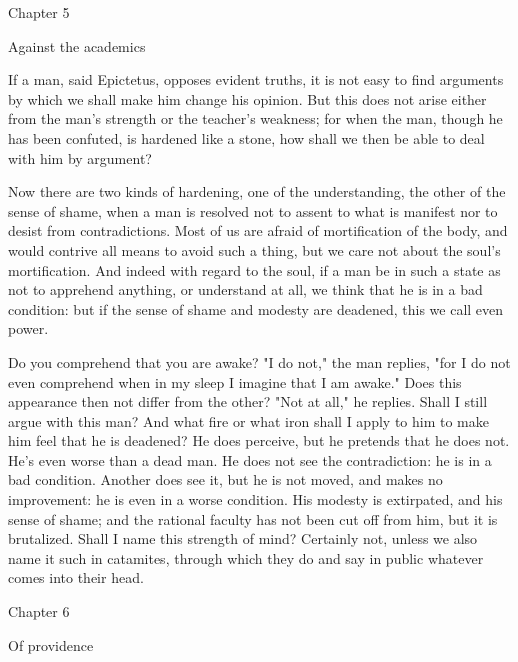 \documentclass[a4paper]{article}
\begin{document}
Chapter 5

Against the academics 

If a man, said Epictetus, opposes evident truths, it is not easy to
find arguments by which we shall make him change his opinion. But
this does not arise either from the man's strength or the teacher's
weakness; for when the man, though he has been confuted, is hardened
like a stone, how shall we then be able to deal with him by argument?

Now there are two kinds of hardening, one of the understanding, the
other of the sense of shame, when a man is resolved not to assent
to what is manifest nor to desist from contradictions. Most of us
are afraid of mortification of the body, and would contrive all means
to avoid such a thing, but we care not about the soul's mortification.
And indeed with regard to the soul, if a man be in such a state as
not to apprehend anything, or understand at all, we think that he
is in a bad condition: but if the sense of shame and modesty are deadened,
this we call even power. 

Do you comprehend that you are awake? "I do not," the man replies,
"for I do not even comprehend when in my sleep I imagine that I am
awake." Does this appearance then not differ from the other? "Not
at all," he replies. Shall I still argue with this man? And what fire
or what iron shall I apply to him to make him feel that he is deadened?
He does perceive, but he pretends that he does not. He's even worse
than a dead man. He does not see the contradiction: he is in a bad
condition. Another does see it, but he is not moved, and makes no
improvement: he is even in a worse condition. His modesty is extirpated,
and his sense of shame; and the rational faculty has not been cut
off from him, but it is brutalized. Shall I name this strength of
mind? Certainly not, unless we also name it such in catamites, through
which they do and say in public whatever comes into their head.

Chapter 6

Of providence 
\end{document}
